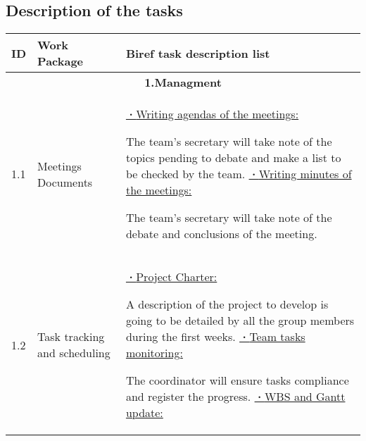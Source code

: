 \subsection{Description of the tasks}
\begin{longtable}{ | p{1.3cm} | p{3cm} | p{11cm} |}
\hline
\textbf{ID} & \textbf{Work Package} & \textbf{Biref task description list} \\ 
\hline
\multicolumn{3}{|c|}{\textbf{1.Managment}} \\ \hline
1.1 & Meetings Documents & 

\underline{\textbf{·}Writing agendas of the meetings:}   

The team’s secretary will take note of the topics pending to debate and make a list to be checked by the team. \newline
\underline{\textbf{·}Writing minutes of the meetings:} 

The team’s secretary will take note of the debate and conclusions of the meeting.\\ \hline

1.2 & Task tracking and scheduling & 

\underline{\textbf{·}Project Charter:}

A description of the project to develop is going to be detailed by all the group members during the first weeks. \newline
\underline{\textbf{·}Team tasks monitoring:}

The coordinator will ensure tasks compliance and register the progress.\newline
\underline{\textbf{·}WBS and Gantt update:}


\end{longtable}
